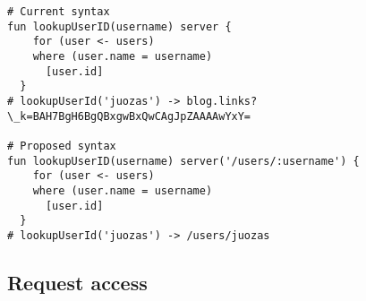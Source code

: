 \begin{codelisting}
\begin{verbatim}
# Current syntax
fun lookupUserID(username) server {
    for (user <- users)
    where (user.name = username)
      [user.id]
  }
# lookupUserId('juozas') -> blog.links?\_k=BAH7BgH6BgQBxgwBxQwCAgJpZAAAAwYxY=

# Proposed syntax
fun lookupUserID(username) server('/users/:username') {
    for (user <- users)
    where (user.name = username)
      [user.id]
  }
# lookupUserId('juozas') -> /users/juozas
\end{verbatim}
\end{codelisting}

\subsection{Request access}


